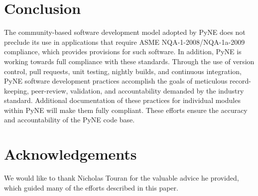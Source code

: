 \documentclass{anstrans}
\begin{document}
\section{Conclusion}

The community-based software development model adopted by PyNE does not
preclude its use in applications that require ASME NQA-1-2008/NQA-1a-2009
compliance, which provides provisions for such software. In addition, PyNE is working towards full compliance with these standards.
Through the use of version control, pull requests, unit testing, nightly builds, and
continuous integration, PyNE software development practices accomplish the
goals of meticulous record-keeping, peer-review, validation, and accountability
demanded by the industry standard. Additional documentation of these practices for
individual modules within PyNE will make them fully compliant. These efforts ensure the accuracy and
accountability of the PyNE code base.

\section{Acknowledgements}

We would like to thank Nicholas Touran for the valuable advice he provided, which
guided many of the efforts described in this paper.



\end{document}
